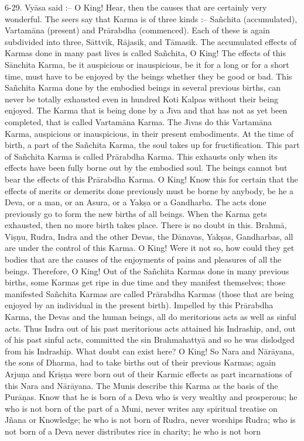 6-29. Vy\=asa said :-- O King! Hear, then the causes that are certainly very wonderful. The seers say that Karma is of three kinds :-- Sa\~nchita (accumulated), Vartam\=ana (present) and Pr\=arabdha (commenced). Each of these is again subdivided into three, S\=attvik, R\=ajasik, and T\=amasik. The accumulated effects of Karmas done in many past lives is called Sa\~nchita, O King! The effects of this S\=anchita Karma, be it auspicious or inauspicious, be it for a long or for a short time, must have to be enjoyed by the beings whether they be good or bad. This Sa\~nchita Karma done by the embodied beings in several previous births, can never be totally exhausted even in hundred Koti Kalpas without their being enjoyed. The Karma that is being done by a J\={\i}va and that has not as yet been completed, that is called Vartam\=ana Karma. The J\={\i}vas do this Vartam\=ana Karma, auspicious or inauspicious, in their present embodiments. At the time of birth, a part of the Sa\~nchita Karma, the soul takes up for fructification. This part of Sa\~nchita Karma is called Pr\=arabdha Karma. This exhausts only when its effects have been fully borne out by the embodied soul. The beings cannot but bear the effects of this Pr\=arabdha Karma. O King! Know this for certain that the effects of merits or demerits done previously must be borne by anybody, be he a Deva, or a man, or an Asura, or a Yak\d{s}a or a Gandharba. The acts done previously go to form the new births of all beings. When the Karma gets exhausted, then no more birth takes place. There is no doubt in this. Brahm\=a, Vi\d{s}\d{n}u, Rudra, Indra and the other Devas, the D\=anavas, Yak\d{s}as, Gandharbas, all are under the control of this Karma. O King! Were it not so, how could they get bodies that are the causes of the enjoyments of pains and pleasures of all the beings. Therefore, O King! Out of the Sa\~nchita Karmas done in many previous births, some Karmas get ripe in due time and they manifest themselves; those manifested Sa\~nchita Karmas are called Pr\=arabdha Karmas (those that are being enjoyed by an individual in the present birth). Impelled by this Pr\=arabdha Karma, the Devas and the human beings, all do meritorious acts as well as sinful acts. Thus Indra out of his past meritorious acts attained his Indraship, and, out of his past sinful acts, committed the sin Brahmahatty\=a and so he was dislodged from his Indraship. What doubt can exist here? O King! So Nara and N\=ar\=ayana, the sons of Dharma, had to take births out of their previous Karmas; again Arju\d{n}a and Kri\d{s}\d{n}a were born out of their Karmic effects as part incarnations of this Nara and N\=ar\=ayana. The Munis describe this Karma as the basis of the Pur\=a\d{n}as. Know that he is born of a Deva who is very wealthy and prosperous; he who is not born of the part of a Muni, never writes any spiritual treatise on J\~nana or Knowledge; he who is not born of Rudra, never worships Rudra; who is not born of a Deva never distributes rice in charity; he who is not born

